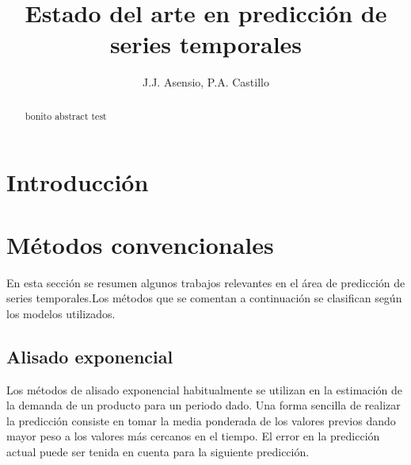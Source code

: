 \documentclass{llncs}
\begin{document}

\title{Estado del arte en predicción de series temporales}


\author{J.J. Asensio, P.A. Castillo}


\maketitle
%
%
\begin{abstract} 
bonito abstract test
\end{abstract}


%
%
\section{Introducción}
\label{sec:intro}


\section{Métodos convencionales}

En esta sección se resumen algunos trabajos relevantes en el área de predicción de series temporales.Los métodos que se comentan a continuación se clasifican según los modelos utilizados. 

\subsection{Alisado exponencial}

Los métodos de alisado exponencial habitualmente se utilizan en la estimación de la demanda de un producto para un periodo dado. Una forma sencilla de realizar la predicción consiste en tomar la media ponderada de los valores previos dando mayor peso a los valores más cercanos en el tiempo. El error en la predicción actual puede ser tenida en cuenta para la siguiente predicción.
\end{document}
